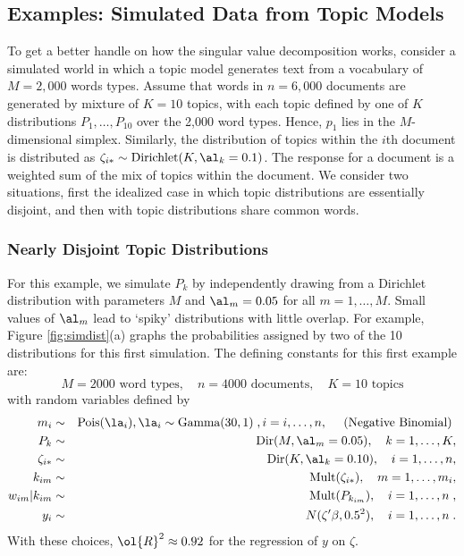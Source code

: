 \documentclass[12pt]{article}
\begin{document}
\subsection{Examples: Simulated Data from Topic Models}

 To get a better handle on how the singular value decomposition works, consider
 a simulated world in which a topic model generates text from a vocabulary of $M
 = 2,000$ words types.  Assume that words in $n = 6,000$ documents are generated by mixture of $K=10$ topics, with each topic defined by  one of $K$ distributions $P_1,\ldots, P_{10}$ over the 2,000 word types.  
 Hence, $p_1$ lies in the $M$-dimensional
 simplex.     Similarly, the distribution of topics within the $i$th document is distributed as $\zeta_{i*} \sim \mbox{Dirichlet}(K, \al_k=0.1)$.  The response for a document is a weighted sum of the mix of topics within the document.  We consider two situations, first the idealized case in which topic distributions are essentially disjoint, and then with topic distributions share common words.
 
 \subsubsection{Nearly Disjoint Topic Distributions} %
 
  
 For this example, we simulate $P_k$ by independently drawing from a Dirichlet distribution with parameters $M$ and $\al_m = 0.05$ for all $m = 1,\ldots,M$.  Small values of $\al_m$ lead to `spiky' distributions with little overlap.  For example, Figure \ref{fig:simdist}(a) graphs the probabilities assigned by two of the 10 distributions for this first simulation.  The defining constants for this first example are:
 \begin{displaymath}
    M = 2000 \mbox{ word types}, \quad
    n = 4000 \mbox{ documents},  \quad
    K = 10 \mbox{ topics}   
 \end{displaymath}
 with random variables defined by
 \begin{eqnarray*}
    m_i           &\sim& \mbox{Pois}(\la_i), \la_i \sim \mbox{Gamma}(30,1)\;,
                     i = i,\ldots, n, \quad \mbox{ (Negative Binomial) }       \cr
    P_k                &\sim& \mbox{Dir}(M, \al_m=0.05), \quad k=1,\ldots,K,  \cr
    \zeta_{i*}        &\sim& \mbox{Dir}(K, \al_k=0.10),\quad i=1,\ldots,n,  \cr
    k_{im}             &\sim& \mbox{Mult}(\zeta_{i*}), \quad m=1,\ldots,m_i,    \cr 
    w_{im}|k_{im} &\sim& \mbox{Mult}(P_{k_{im}}), \quad i=1,\ldots,n \;, \cr
    y_i                  &\sim& N(\zeta'\beta, 0.5^2), \quad i = 1,\ldots,n \;.
 \end{eqnarray*}
 With these choices, $\ol{R}^2 \approx 0.92$ for the regression of $y$ on $\zeta$.
\end{document}
